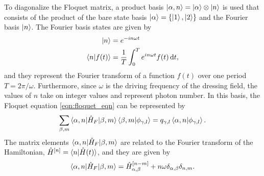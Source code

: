To diagonalize the Floquet matrix, a product basis $\ket{\alpha,n}=\ket{\alpha}\otimes\ket{n}$ is used that consists of the product of the bare state basis $\ket{\alpha}=\{\ket{1},\ket{2}\}$ and the Fourier basis $\ket{n}$.  The Fourier basis states are given by
\begin{equation}
	\begin{aligned}
	\ket{n}&=e^{-in\omega t }\\
	\braket{n|f(t)} &= \frac{1}{T}\int_{0}^{T}e^{in\omega t}f(t)\mathop{}\!\mathrm{d} t,
	\end{aligned}
\end{equation}
and they represent the Fourier transform of a function $f(t)$ over one period $T=2\pi/\omega$.  Furthermore, since $\omega$ is the driving frequency of the dressing field, the values of $n$ take on integer values and represent photon number.  In this basis, the Floquet equation \ref{eqn:floquet_eqn} can be represented by
\begin{equation}
	\sum_{\beta,m}\braket{\alpha,n|\hat{H}_F|\beta,m}\braket{\beta,m|\phi_{\gamma,l}} = q_{\gamma,l}\braket{\alpha,n|\phi_{\gamma,l}}.
\end{equation}
The matrix elements $\braket{\alpha,n|\hat{H}_F|\beta,m}$ are related to the Fourier transform of the Hamiltonian, $\hat{H}^{[n]}=\braket{n|\hat{H}(t)}$, and they are given by
\begin{equation}
	\braket{\alpha,n|\hat{H}_F|\beta,m} = \hat{H}_{\alpha,\beta}^{[n-m]} + n\omega\delta_{\alpha,\beta}\delta_{n,m}.
\end{equation}

